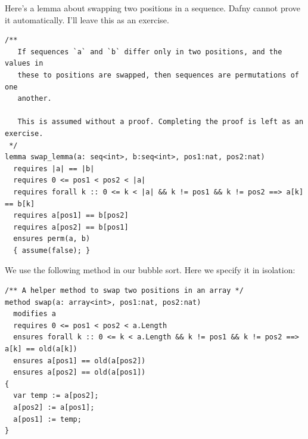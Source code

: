 \documentclass[11pt]{article}
\begin{document}
Here's a lemma about swapping two positions in a sequence. Dafny cannot prove it automatically.
I'll leave this as an exercise.

\begin{lstlisting}[language=dafny]
/**
   If sequences `a` and `b` differ only in two positions, and the values in
   these to positions are swapped, then sequences are permutations of one
   another.

   This is assumed without a proof. Completing the proof is left as an exercise.
 */
lemma swap_lemma(a: seq<int>, b:seq<int>, pos1:nat, pos2:nat)
  requires |a| == |b|
  requires 0 <= pos1 < pos2 < |a|
  requires forall k :: 0 <= k < |a| && k != pos1 && k != pos2 ==> a[k] == b[k]
  requires a[pos1] == b[pos2]
  requires a[pos2] == b[pos1]
  ensures perm(a, b)
  { assume(false); }
\end{lstlisting}

We use the following method in our bubble sort. Here we specify it in isolation:
\begin{lstlisting}[language=dafny]
/** A helper method to swap two positions in an array */
method swap(a: array<int>, pos1:nat, pos2:nat)
  modifies a
  requires 0 <= pos1 < pos2 < a.Length
  ensures forall k :: 0 <= k < a.Length && k != pos1 && k != pos2 ==> a[k] == old(a[k])
  ensures a[pos1] == old(a[pos2])
  ensures a[pos2] == old(a[pos1])
{
  var temp := a[pos2];
  a[pos2] := a[pos1];
  a[pos1] := temp;
}
\end{lstlisting}
\end{document}
